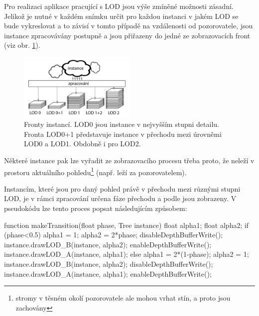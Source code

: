 Pro realizaci aplikace pracující s LOD jsou výše zmíněné možnosti zásadní. Jelikož je nutné v každém snímku určit pro každou instanci v jakém LOD se bude vykreslovat a to závisí v tomto případě na vzdálenosti od pozorovatele, jsou instance zpracovávány postupně a jsou přiřazeny do jedné ze zobrazovacích front (viz obr. \ref{fig:InstanceQueues}). 
\begin{figure}[!hbt]
\begin{center}
\includegraphics[width=0.5\textwidth]{./figures/renderQueuesA.png}
\end{center}
\caption[Fronty instancí]%
{Fronty instancí. LOD0 jsou instance v nejvyšším stupni detailu. Fronta LOD0+1 představuje instance v přechodu mezi úrovněmi LOD0 a LOD1. Obdobně i pro LOD2.
\label{fig:InstanceQueues}
}
\end{figure}
Některé instance pak lze vyřadit ze zobrazovacího procesu třeba proto, že neleží v prostoru aktuálního pohledu\footnote{stromy v těsném okolí pozorovatele ale mohou vrhat stín, a proto jsou zachovány} (např. leží za pozorovatelem). 

Instancím, které jsou pro daný pohled právě v přechodu mezi různými stupni LOD, je v rámci zpracování určena fáze přechodu a podle \cite{GIEGL-2007-UNP} jsou zobrazeny. V pseudokódu lze tento proces popsat následujícím způsobem:
\begin{verbatimtab}[4]
function makeTransition(float phase, Tree instance){
	float alpha1;
	float alpha2;
	if (phase<0.5){
		alpha1 = 1;	
		alpha2 = 2*phase;
		disableDepthBufferWrite();
			instance.drawLOD_B(instance, alpha2);
		enableDepthBufferWrite();
		instance.drawLOD_A(instance, alpha1);					
	} else {			
		alpha1 = 2*(1-phase);
		alpha2 = 1;	
		instance.drawLOD_B(instance, alpha2);	
		disableDepthBufferWrite();
			instance.drawLOD_A(instance, alpha1);
		enableDepthBufferWrite();	
	} 
}
\end{verbatimtab}

